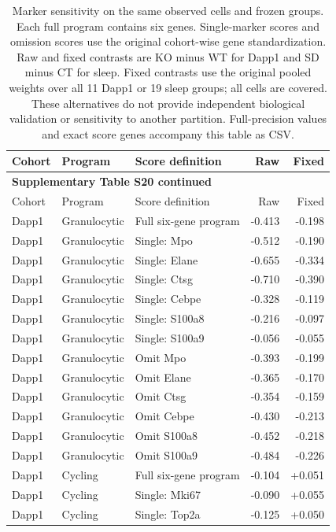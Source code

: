 \small
\setlength{\tabcolsep}{5pt}
\begin{longtable}{@{}llp{5.4cm}rr@{}}
\caption{Marker sensitivity on the same observed cells and frozen groups. Each full program contains six genes. Single-marker scores and omission scores use the original cohort-wise gene standardization. Raw and fixed contrasts are KO minus WT for Dapp1 and SD minus CT for sleep. Fixed contrasts use the original pooled weights over all 11 Dapp1 or 19 sleep groups; all cells are covered. These alternatives do not provide independent biological validation or sensitivity to another partition. Full-precision values and exact score genes accompany this table as CSV.}\label{tab:s20}\\
\toprule Cohort & Program & Score definition & Raw & Fixed\\\midrule\endfirsthead
\multicolumn{5}{l}{\textbf{Supplementary Table S20 continued}}\\
\toprule Cohort & Program & Score definition & Raw & Fixed\\\midrule\endhead
\bottomrule\endfoot
Dapp1 & Granulocytic & Full six-gene program & -0.413 & -0.198\\
Dapp1 & Granulocytic & Single: Mpo & -0.512 & -0.190\\
Dapp1 & Granulocytic & Single: Elane & -0.655 & -0.334\\
Dapp1 & Granulocytic & Single: Ctsg & -0.710 & -0.390\\
Dapp1 & Granulocytic & Single: Cebpe & -0.328 & -0.119\\
Dapp1 & Granulocytic & Single: S100a8 & -0.216 & -0.097\\
Dapp1 & Granulocytic & Single: S100a9 & -0.056 & -0.055\\
Dapp1 & Granulocytic & Omit Mpo & -0.393 & -0.199\\
Dapp1 & Granulocytic & Omit Elane & -0.365 & -0.170\\
Dapp1 & Granulocytic & Omit Ctsg & -0.354 & -0.159\\
Dapp1 & Granulocytic & Omit Cebpe & -0.430 & -0.213\\
Dapp1 & Granulocytic & Omit S100a8 & -0.452 & -0.218\\
Dapp1 & Granulocytic & Omit S100a9 & -0.484 & -0.226\\
\addlinespace[4pt]
Dapp1 & Cycling & Full six-gene program & -0.104 & +0.051\\
Dapp1 & Cycling & Single: Mki67 & -0.090 & +0.055\\
Dapp1 & Cycling & Single: Top2a & -0.125 & +0.050\\

\end{longtable}
